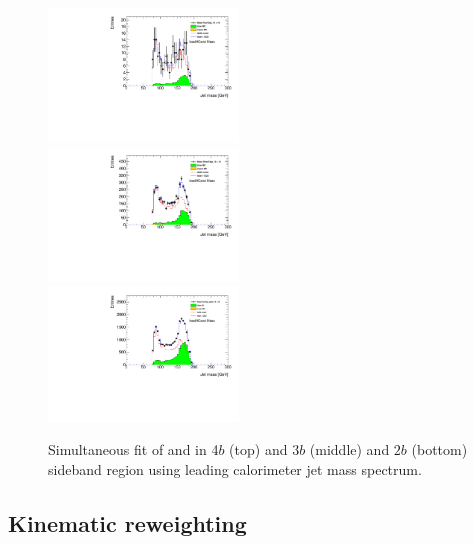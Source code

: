 \begin{figure}[htbp!]
\begin{center}
 \includegraphics[width=0.45\textwidth,angle=-90]{figures/boosted/Fit/fitNorm_i4.pdf}\\
 \includegraphics[width=0.45\textwidth,angle=-90]{figures/boosted/Fit/fitNorm_i3.pdf}\\
 \includegraphics[width=0.45\textwidth,angle=-90]{figures/boosted/Fit/fitNorm_i2s.pdf}\\
\caption{Simultaneous fit of \muqcd and \alphatt in 4$b$ (top) and 3$b$ (middle) and $2b$ (bottom) sideband region using leading \largeR calorimeter jet mass spectrum.}
\label{fig:ttbar-fit}
\end{center}
\end{figure}

\clearpage


\subsection{Kinematic reweighting}
\label{sec:boosted-reweight}


